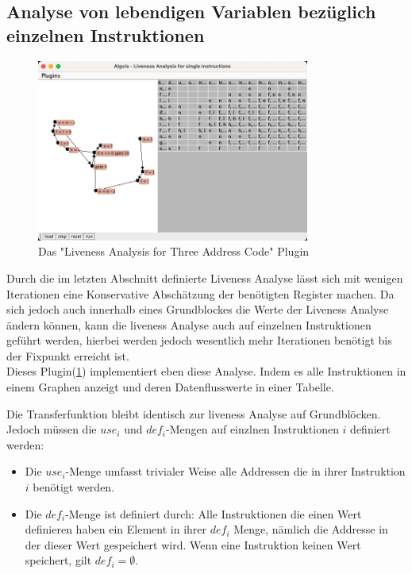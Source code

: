 \subsection{Analyse von lebendigen Variablen bezüglich einzelnen Instruktionen}
\begin{figure}[h]
  \centering
  \includegraphics[width=0.8\textwidth]{fig/Screenshot_LivenesTAC.png}
  \caption{Das "Liveness Analysis for Three Address Code" Plugin}
  \label{fig:livenessAnalysisTAC}
\end{figure}
Durch die im letzten Abschnitt definierte Liveness Analyse lässt sich mit wenigen
Iterationen eine Konservative Abschätzung der benötigten Register machen.
Da sich jedoch auch innerhalb eines Grundblockes die Werte der Liveness Analyse ändern können,
kann die liveness Analyse auch auf einzelnen Instruktionen geführt werden, 
hierbei werden jedoch wesentlich mehr Iterationen benötigt bis der Fixpunkt erreicht ist.\\

Dieses Plugin(\cref{fig:livenessAnalysisTAC}) implementiert eben diese Analyse. Indem es alle Instruktionen
in einem Graphen anzeigt und deren Datenflusswerte in einer Tabelle.

Die Transferfunktion bleibt identisch zur liveness Analyse auf Grundblöcken.
Jedoch müssen die $use_i$ und $def_i$-Mengen auf einzlnen Instruktionen $i$
definiert werden:
\begin{itemize}
  \item Die $use_i$-Menge umfasst trivialer Weise alle Addressen die in ihrer Instruktion $i$
    benötigt werden.
  \item Die $def_i$-Menge ist definiert durch: 
    Alle Instruktionen die einen Wert definieren haben ein Element in ihrer
    $def_i$ Menge, nämlich die Addresse in der dieser Wert gespeichert wird.
    Wenn eine Instruktion keinen Wert speichert, gilt $def_i=\emptyset$.
\end{itemize}
